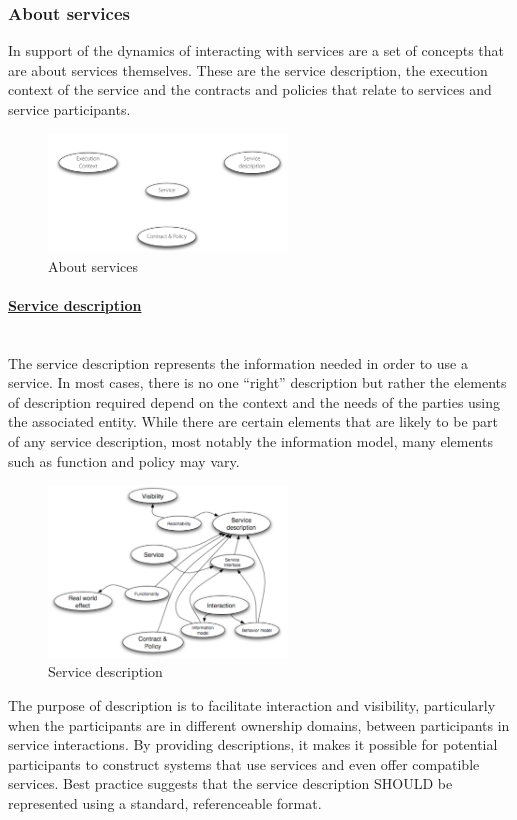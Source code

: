 \documentclass[10pt,a4paper]{article}
\newcommand{\myparagraph}[1]{\paragraph{\uline{#1}}\mbox{}\\[0.05in]}
\begin{document}
\subsubsection{About services}
In support of the dynamics of interacting with services are a set of concepts that are about services themselves. These are the service description, the execution context of the service and the contracts and policies that relate to services and service participants.
\begin{figure}[h!]
 \hfill \includegraphics[width=180pt]{images/about-services}\hspace*{\fill}
  \caption{About services}
  \label{fig:about-services}
\end{figure}
\myparagraph{Service description}
The service description represents the information needed in order to use a service. In most cases, there is no one “right” description but rather the elements of description required depend on the context and the needs of the parties using the associated entity. While there are certain elements that are likely to be part of any service description, most notably the information model, many elements such as function and policy may vary.
\begin{figure}[h!]
 \hfill \includegraphics[width=180pt]{images/service-description}\hspace*{\fill}
  \caption{Service description}
  \label{fig:description}
\end{figure}
The purpose of description is to facilitate interaction and visibility, particularly when the participants are in different ownership domains, between participants in service interactions. By providing descriptions, it makes it possible for potential participants to construct systems that use services and even offer compatible services. Best practice suggests that the service description SHOULD be represented using a standard, referenceable format. \\ \\
\end{document}
